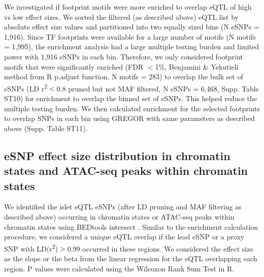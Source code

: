 We investigated if footprint motifs were more enriched to overlap eQTL of high vs low effect sizes. We sorted the filtered (as described above) eQTL list by absolute effect size values and partitioned into two equally sized bins (N eSNPs = 1,916). Since TF footprints were available for a large number of motifs (N motifs = 1,995), the enrichment analysis had a large multiple testing burden and limited power with 1,916 eSNPs in each bin. Therefore, we only considered footprint motifs that were significantly enriched (FDR $<$1\%, Benjamini \& Yekutieli method from R p.adjust function, N motifs = 283) to overlap the bulk set of eSNPs (LD r\textsuperscript{2}$<$0.8 pruned but not MAF filtered, N eSNPs = 6,468, Supp. Table ST10) for enrichment to overlap the binned set of eSNPs. This helped reduce the multiple testing burden. We then calculated enrichment for the selected footprints to overlap SNPs in each bin using GREGOR with same parameters as described above (Supp. Table ST11).

\subsection{eSNP effect size distribution in chromatin states and ATAC-seq peaks within chromatin states}
We identified the islet eQTL eSNPs (after LD pruning and MAF filtering as described above) occurring in chromatin states or ATAC-seq peaks within chromatin states using BEDtools intersect \cite{quinlanBEDToolsFlexibleSuite2010}. Similar to the enrichment calculation procedure, we considered a unique eQTL overlap if the lead eSNP or a proxy SNP with LD(r\textsuperscript{2})$>$0.99 occurred in these regions. We considered the effect size as the slope or the beta from the linear regression for the eQTL overlapping each region. P values were calculated using the Wilcoxon Rank Sum Test in R.
    
